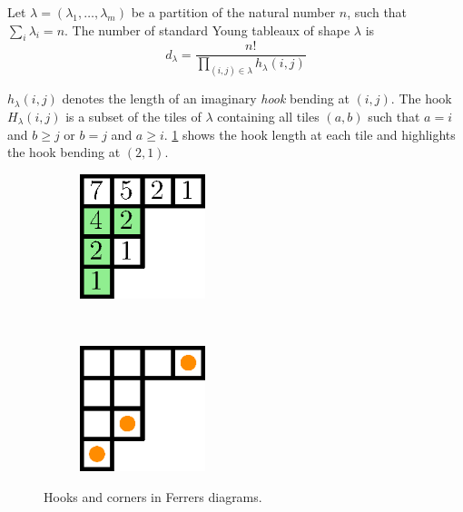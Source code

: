 \begin{theorem}
\label{theorem:xy:lattice:hook}
Let \(\lambda = (\lambda_1,\ldots,\lambda_m)\) be a partition of the natural
number \(n\), \ie such that \(\sum_i \lambda_i = n\). The number of standard
Young tableaux of shape \(\lambda\) is
\begin{displaymath}
d_{\lambda} = \frac{n!}{\prod_{(i,j) \in \lambda} h_{\lambda}(i,j)}
\end{displaymath}
\end{theorem}

\(h_{\lambda}(i,j)\) denotes the length of an imaginary \emph{hook} bending at
\((i,j)\). The hook \(H_{\lambda}(i,j)\) is a subset of the tiles of
\(\lambda\) containing all tiles \((a,b)\) such that \(a = i\) and \(b \ge j\)
or \(b = j\) and \(a \ge i\). \ref{fig:xy:lattice:hooks} shows the hook length
at each tile and highlights the hook bending at \((2,1)\).

\begin{figure}
\centering
\begin{subfigure}[t]{0.47\textwidth}
\centering
	\includegraphics[width=0.4\textwidth]{fig/x+y/lattice/hooks}
	\label{fig:xy:lattice:hooks}
\end{subfigure}
~
\begin{subfigure}[t]{0.47\textwidth}
\centering
	\includegraphics[width=0.4\textwidth]{fig/x+y/lattice/corners}
	\label{fig:xy:lattice:corners}
\end{subfigure}
\caption{Hooks and corners in Ferrers diagrams.}
\end{figure}

